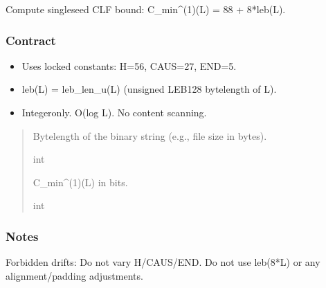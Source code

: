 \documentclass[letterpaper,10pt,english]{sphinxmanual}
\begin{document}
\begin{fulllineitems}
\label{\detokenize{clf_calculator:id0}}
\pysigstartsignatures
\pysiglinewithargsret
{}
{}
{}
\pysigstopsignatures
\sphinxAtStartPar
Compute single\sphinxhyphen{}seed CLF bound: C\_min\textasciicircum{}(1)(L) = 88 + 8*leb(L).


\subsubsection{Contract}
\label{\detokenize{clf_calculator:id3}}\begin{itemize}
\item {} 
\sphinxAtStartPar
Uses locked constants: H=56, CAUS=27, END=5.

\item {} 
\sphinxAtStartPar
leb(L) = leb\_len\_u(L) (unsigned LEB128 byte\sphinxhyphen{}length of L).

\item {} 
\sphinxAtStartPar
Integer\sphinxhyphen{}only. O(log L). No content scanning.

\end{itemize}
\begin{quote}\begin{description}
\sphinxAtStartPar
{}

\sphinxAtStartPar
Byte\sphinxhyphen{}length of the binary string (e.g., file size in bytes).

\sphinxAtStartPar
int

\sphinxAtStartPar
C\_min\textasciicircum{}(1)(L) in bits.

\sphinxAtStartPar
int

\end{description}\end{quote}
\subsubsection*{Notes}

\sphinxAtStartPar
Forbidden drifts:
\sphinxhyphen{} Do not vary H/CAUS/END.
\sphinxhyphen{} Do not use leb(8*L) or any alignment/padding adjustments.

\end{fulllineitems}
\end{document}
